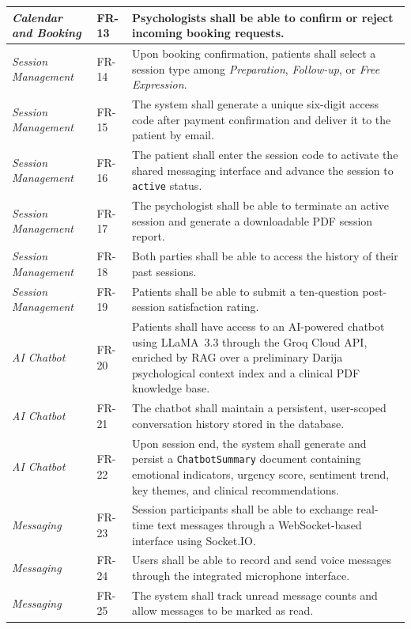 \documentclass[a4paper,12pt]{report}
\begin{document}
\begin{longtable}{@{} L{0.24\textwidth} L{0.14\textwidth} L{0.54\textwidth} @{}}
\midrule
\emph{Calendar and Booking} & FR-13 & Psychologists shall be able to confirm or reject incoming booking requests. \\
\midrule
\emph{Session Management} & FR-14 & Upon booking confirmation, patients shall select a session type among \textit{Preparation}, \textit{Follow-up}, or \textit{Free Expression}. \\
\midrule
\emph{Session Management} & FR-15 & The system shall generate a unique six-digit access code after payment confirmation and deliver it to the patient by email. \\
\midrule
\emph{Session Management} & FR-16 & The patient shall enter the session code to activate the shared messaging interface and advance the session to \texttt{active} status. \\
\midrule
\emph{Session Management} & FR-17 & The psychologist shall be able to terminate an active session and generate a downloadable PDF session report. \\
\midrule
\emph{Session Management} & FR-18 & Both parties shall be able to access the history of their past sessions. \\
\midrule
\emph{Session Management} & FR-19 & Patients shall be able to submit a ten-question post-session satisfaction rating. \\
\midrule
\emph{AI Chatbot} & FR-20 & Patients shall have access to an AI-powered chatbot using LLaMA~3.3 through the Groq Cloud API, enriched by RAG over a preliminary Darija psychological context index and a clinical PDF knowledge base. \\
\midrule
\emph{AI Chatbot} & FR-21 & The chatbot shall maintain a persistent, user-scoped conversation history stored in the database. \\
\midrule
\emph{AI Chatbot} & FR-22 & Upon session end, the system shall generate and persist a \texttt{ChatbotSummary} document containing emotional indicators, urgency score, sentiment trend, key themes, and clinical recommendations. \\
\midrule
\emph{Messaging} & FR-23 & Session participants shall be able to exchange real-time text messages through a WebSocket-based interface using Socket.IO. \\
\midrule
\emph{Messaging} & FR-24 & Users shall be able to record and send voice messages through the integrated microphone interface. \\
\midrule
\emph{Messaging} & FR-25 & The system shall track unread message counts and allow messages to be marked as read. \\

\end{longtable}
\end{document}
